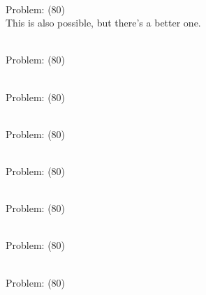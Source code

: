 \documentclass[11pt]{article}
\begin{document}
\begin{minipage}[t]{0.5\textwidth}
  {\centering
  
\\
Problem: (80)\\
This is also possible, but there's a better one.\\
  }
\end{minipage}
\begin{minipage}[t]{0.5\textwidth}
  {\centering
  
\\
Problem: (80)\\
  }
\end{minipage}
\begin{minipage}[t]{0.5\textwidth}
  {\centering
  
\\
Problem: (80)\\
  }
\end{minipage}
\begin{minipage}[t]{0.5\textwidth}
  {\centering
  
\\
Problem: (80)\\
  }
\end{minipage}
\begin{minipage}[t]{0.5\textwidth}
  {\centering
  
\\
Problem: (80)\\
  }
\end{minipage}
\begin{minipage}[t]{0.5\textwidth}
  {\centering
  
\\
Problem: (80)\\
  }
\end{minipage}
\begin{minipage}[t]{0.5\textwidth}
  {\centering
  
\\
Problem: (80)\\
  }
\end{minipage}
\begin{minipage}[t]{0.5\textwidth}
  {\centering
  
\\
Problem: (80)\\
  }
\end{minipage}
\end{document}

